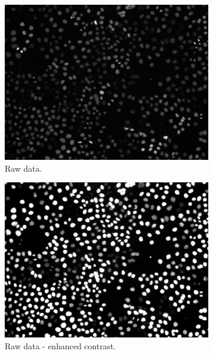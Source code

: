 \begin{figure}
    \begin{subfigure}[t]{0.48\textwidth}
        \includegraphics[width=\textwidth]{images/joint/overseg/85/raw.png}
        \caption{Raw data.}
    \end{subfigure}
    \hfill
    \begin{subfigure}[t]{0.48\textwidth}
        \includegraphics[width=\textwidth]{images/joint/overseg/85/raw_high_contrast.png}
        \caption{Raw data - enhanced contrast.}
    \end{subfigure}
    \\
    \begin{subfigure}[t]{0.48\textwidth}

\end{subfigure}
\end{figure}
